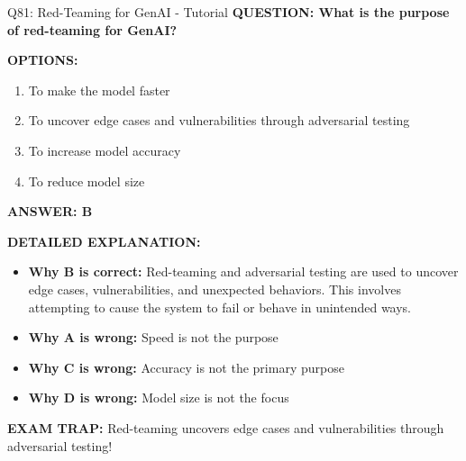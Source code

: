 \documentclass[8pt]{beamer}
\begin{document}
	\begin{frame}{Q81: Red-Teaming for GenAI - Tutorial}
		\fontsize{6.5}{7.5}\selectfont
		\textbf{QUESTION: What is the purpose of red-teaming for GenAI?}
		
		\vspace{0.1cm}
		\textbf{OPTIONS:}
		\begin{enumerate}
			\item To make the model faster
			\item To uncover edge cases and vulnerabilities through adversarial testing
			\item To increase model accuracy
			\item To reduce model size
		\end{enumerate}
		
		\vspace{0.1cm}
		\textcolor{myblue}{\textbf{ANSWER: B}}
		
		\vspace{0.1cm}
		\textbf{DETAILED EXPLANATION:}
		\begin{itemize}
			\item \textbf{Why B is correct:} Red-teaming and adversarial testing are used to uncover edge cases, vulnerabilities, and unexpected behaviors. This involves attempting to cause the system to fail or behave in unintended ways.
			\item \textbf{Why A is wrong:} Speed is not the purpose
			\item \textbf{Why C is wrong:} Accuracy is not the primary purpose
			\item \textbf{Why D is wrong:} Model size is not the focus
		\end{itemize}
		
		\textcolor{myred}{\textbf{EXAM TRAP:}} Red-teaming uncovers \textcolor{myblue}{edge cases and vulnerabilities} through adversarial testing!
	\end{frame}
	
\end{document}
